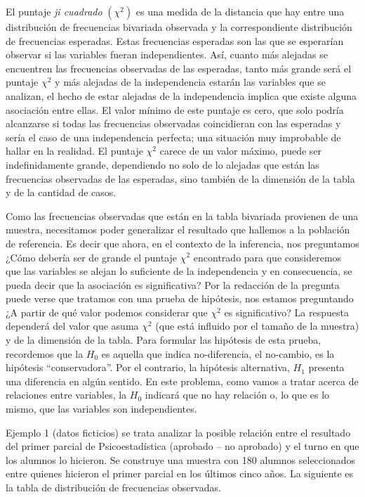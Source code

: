 \documentclass[]{book}
\begin{document}
El puntaje \emph{ji cuadrado} \((\chi^{2})\) es una medida de la
distancia que hay entre una distribución de frecuencias bivariada
observada y la correspondiente distribución de frecuencias esperadas.
Estas frecuencias esperadas son las que se esperarían observar si las
variables fueran independientes. Así, cuanto más alejadas se encuentren
las frecuencias observadas de las esperadas, tanto más grande será el
puntaje \(\chi^{2}\) y más alejadas de la independencia estarán las
variables que se analizan, el hecho de estar alejadas de la
independencia implica que existe alguna asociación entre ellas. El valor
mínimo de este puntaje es cero, que solo podría alcanzarse si todas las
frecuencias observadas coincidieran con las esperadas y sería el caso de
una independencia perfecta; una situación muy improbable de hallar en la
realidad. El puntaje \(\chi^{2}\) carece de un valor máximo, puede ser
indefinidamente grande, dependiendo no solo de lo alejadas que están las
frecuencias observadas de las esperadas, sino también de la dimensión de
la tabla y de la cantidad de casos.

Como las frecuencias observadas que están en la tabla bivariada
provienen de una muestra, necesitamos poder generalizar el resultado que
hallemos a la población de referencia. Es decir que ahora, en el
contexto de la inferencia, nos preguntamos ¿Cómo debería ser de grande
el puntaje \(\chi^{2}\) encontrado para que consideremos que las variables
se alejan lo suficiente de la independencia y en consecuencia, se pueda decir que la asociación es significativa? Por la redacción de la
pregunta puede verse que tratamos con una prueba de hipótesis, nos
estamos preguntando ¿A partir de qué valor podemos considerar que
\(\chi^{2}\) es significativo? La respuesta dependerá del valor que asuma
\(\chi^{2}\) (que está influido por el tamaño de la muestra) y de la
dimensión de la tabla. Para formular las hipótesis de esta prueba,
recordemos que la \(H_0\) es aquella que indica no-diferencia, el
no-cambio, es la hipótesis ``conservadora''. Por el contrario, la
hipótesis alternativa, \(H_1\) presenta una diferencia en algún sentido. En este
problema, como vamos a tratar acerca de relaciones entre variables, la
\(H_0\) indicará que no hay relación o, lo que es lo mismo, que las
variables son independientes.

Ejemplo 1 (datos ficticios) se trata analizar la posible relación entre el
resultado del primer parcial de Psicoestadística (aprobado -- no
aprobado) y el turno en que los alumnos lo hicieron. Se construye una
muestra con 180 alumnos seleccionados entre quienes hicieron el primer
parcial en los últimos cinco años. La siguiente es la tabla de
distribución de frecuencias observadas.
\end{document}
